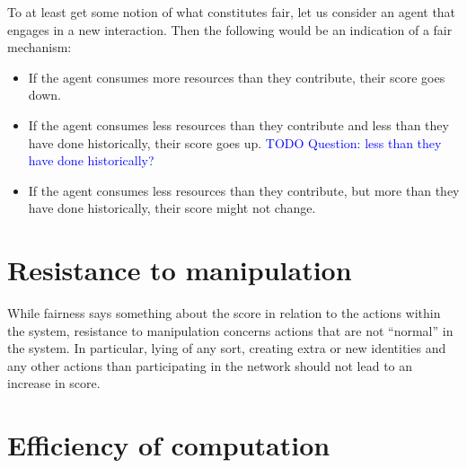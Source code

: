 \documentclass[a4paper,11pt]{book}
\newcommand\question[1]{\textcolor{blue}{TODO Question: #1}}
\theoremstyle{definition}
\begin{document}
To at least get some notion of what constitutes fair, let us consider an agent that
engages in a new interaction. Then the following would be an indication of a fair mechanism:

\begin{itemize}
    \item If the agent consumes more resources than they contribute, their score goes down.
    \item If the agent consumes less resources than they contribute and less than they have
        done historically, their score goes up.
				\question{less than they have done historically?}
     \item If the agent consumes less resources than they contribute, but more than they have
        done historically, their score might not change.
\end{itemize}

\section{Resistance to manipulation}

While fairness says something about the score in relation to the actions within
the system, resistance to manipulation concerns actions that are not ``normal''
in the system. In particular, lying of any sort, creating extra or new identities
and any other actions than participating in the network should not lead to an
increase in score.

\section{Efficiency of computation}
\end{document}
